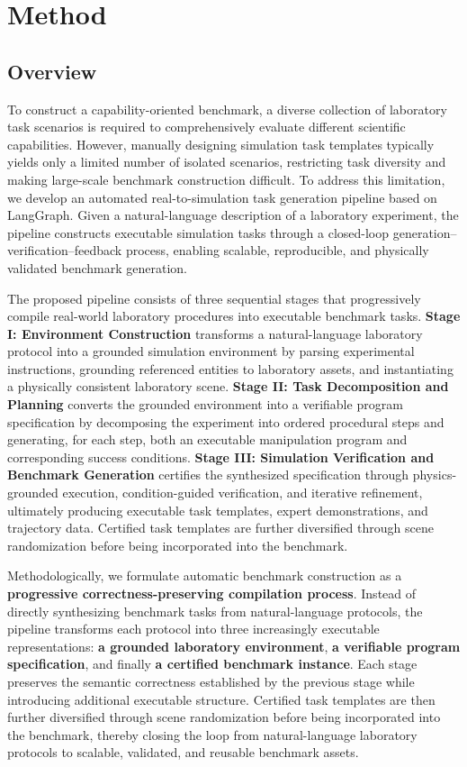 \documentclass[sigconf]{acmart}
\begin{document}
\section{Method}

\subsection{Overview}
\label{sec:overview}

To construct a capability-oriented benchmark, a diverse collection of laboratory task scenarios is required to comprehensively evaluate different scientific capabilities. However, manually designing simulation task templates typically yields only a limited number of isolated scenarios, restricting task diversity and making large-scale benchmark construction difficult. To address this limitation, we develop an automated real-to-simulation task generation pipeline based on LangGraph. Given a natural-language description of a laboratory experiment, the pipeline constructs executable simulation tasks through a closed-loop generation--verification--feedback process, enabling scalable, reproducible, and physically validated benchmark generation.

The proposed pipeline consists of three sequential stages that progressively compile real-world laboratory procedures into executable benchmark tasks. \textbf{Stage I: Environment Construction} transforms a natural-language laboratory protocol into a grounded simulation environment by parsing experimental instructions, grounding referenced entities to laboratory assets, and instantiating a physically consistent laboratory scene. \textbf{Stage II: Task Decomposition and Planning} converts the grounded environment into a verifiable program specification by decomposing the experiment into ordered procedural steps and generating, for each step, both an executable manipulation program and corresponding success conditions. \textbf{Stage III: Simulation Verification and Benchmark Generation} certifies the synthesized specification through physics-grounded execution, condition-guided verification, and iterative refinement, ultimately producing executable task templates, expert demonstrations, and trajectory data. Certified task templates are further diversified through scene randomization before being incorporated into the benchmark.

Methodologically, we formulate automatic benchmark construction as a \textbf{progressive correctness-preserving compilation process}. Instead of directly synthesizing benchmark tasks from natural-language protocols, the pipeline transforms each protocol into three increasingly executable representations: \textbf{a grounded laboratory environment}, \textbf{a verifiable program specification}, and finally \textbf{a certified benchmark instance}. Each stage preserves the semantic correctness established by the previous stage while introducing additional executable structure. Certified task templates are then further diversified through scene randomization before being incorporated into the benchmark, thereby closing the loop from natural-language laboratory protocols to scalable, validated, and reusable benchmark assets.
\end{document}
